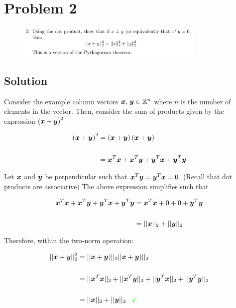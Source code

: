 
\begingroup
\allowdisplaybreaks

\newpage
\section*{Problem 2}

\begin{figure}[h]
	\centering
	\includegraphics[width=0.8\textwidth]{./images/prob2_statement.png}
\end{figure}

\subsection*{Solution}

Consider the example column vectors $\boldsymbol{x},\,\boldsymbol{y} \in \mathbb{R}^{n}$ where $n$ is the number of elements in the vector. Then, consider the sum of products given by the expression $\left(\boldsymbol{x} + \boldsymbol{y}\right)^2$

\begin{align*}
	\left(\boldsymbol{x} + \boldsymbol{y}\right)^2 &= \left(\boldsymbol{x} + \boldsymbol{y}\right) \left(\boldsymbol{x} + \boldsymbol{y}\right) \\
	\\
	&= \boldsymbol{x}^T\boldsymbol{x} + \boldsymbol{x}^T\boldsymbol{y} + \boldsymbol{y}^T\boldsymbol{x} + \boldsymbol{y}^T\boldsymbol{y}
\end{align*}

Let $\boldsymbol{x}$ and $\boldsymbol{y}$ be perpendicular such that $\boldsymbol{x}^T\boldsymbol{y} = \boldsymbol{y}^T\boldsymbol{x} = 0$. (Recall that dot products are associative) The above expression simplifies such that

\begin{align*}
	\boldsymbol{x}^T\boldsymbol{x} + \boldsymbol{x}^T\boldsymbol{y} + \boldsymbol{y}^T\boldsymbol{x} + \boldsymbol{y}^T\boldsymbol{y} &= \boldsymbol{x}^T\boldsymbol{x} + 0 + 0 + \boldsymbol{y}^T\boldsymbol{y} \\
	\\
	&= || {\boldsymbol{x}} ||_2 + || {\boldsymbol{y}} ||_2 
\end{align*}

Therefore, within the two-norm operation:

\begin{align*}
	|| {\boldsymbol{x} + \boldsymbol{y}} ||_2^2 &= || {\boldsymbol{x} + \boldsymbol{y})} ||_2 || {\boldsymbol{x} + \boldsymbol{y})} ||_2 \\
	\\
	&= || {\boldsymbol{x}^T\boldsymbol{x}} ||_2 + || {\boldsymbol{x}^T\boldsymbol{y}} ||_2 + || {\boldsymbol{y}^T\boldsymbol{x}} ||_2 + || {\boldsymbol{y}^T\boldsymbol{y}} ||_2 \\
	\\
	&= || {\boldsymbol{x}} ||_2 + || {\boldsymbol{y}} ||_2 \,\,\,\,\, \textcolor{green}{\checkmark}
\end{align*}